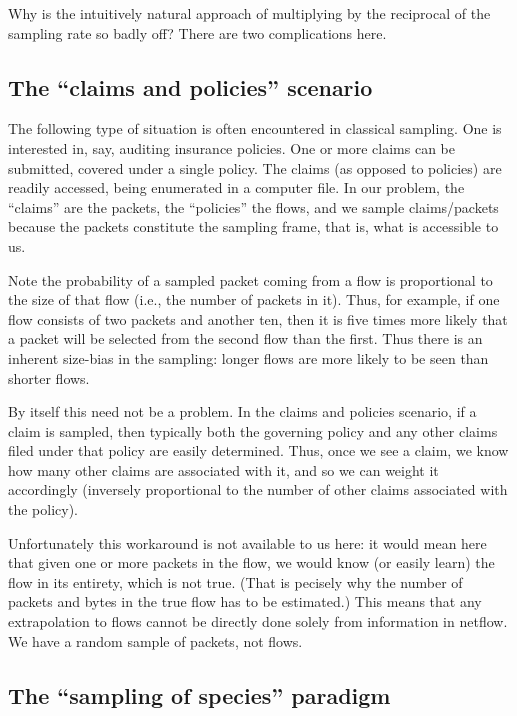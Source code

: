 \documentclass{paper}
\begin{document}
Why is the intuitively natural approach of multiplying by the reciprocal of the
sampling rate so badly off? There are two complications here.

\subsection{The ``claims and policies'' scenario}

The following type of situation is often encountered in classical sampling.  One
is interested in, say, auditing insurance policies. One or more claims can be
submitted, covered under a single policy. The claims (as opposed to policies)
are readily accessed, being enumerated in a computer file. In our problem, the
``claims'' are the packets, the ``policies'' the flows, and we sample
claims/packets because the packets constitute the sampling frame, that is, what
is accessible to us.

Note the probability of a sampled packet coming from a flow is proportional to
the size of that flow (i.e., the number of packets in it). Thus, for example, if
one flow consists of two packets and another ten, then it is five times more
likely that a packet will be selected from the second flow than the first. Thus
there is an inherent size-bias in the sampling: longer flows are more likely to
be seen than shorter flows.

By itself this need not be a problem. In the claims and policies scenario, if a
claim is sampled, then typically both the governing policy and any other claims
filed under that policy are easily determined. Thus, once we see a claim, we
know how many other claims are associated with it, and so we can weight it
accordingly (inversely proportional to the number of other claims associated
with the policy).

Unfortunately this workaround is not available to us here: it would mean here
that given one or more packets in the flow, we would know (or easily learn) the
flow in its entirety, which is not true. (That is pecisely why the number of
packets and bytes in the true flow has to be estimated.) This means that any
extrapolation to flows cannot be directly done solely from information in
netflow. We have a random sample of packets, not flows.

\subsection{The ``sampling of species'' paradigm}
\end{document}
